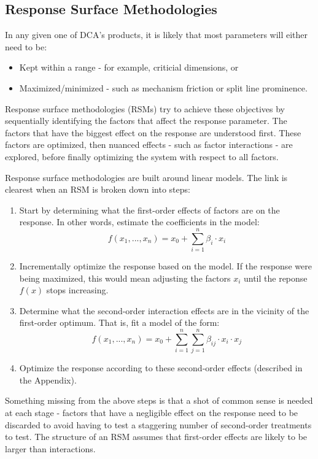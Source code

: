 \documentclass[11pt,a4paper,article]{memoir} %
\begin{document}
\subsection*{Response Surface Methodologies}
In any given one of DCA's products, it is likely that most parameters will either need to be:
\begin{itemize}
	\item Kept within a range - for example, criticial dimensions, or
	\item Maximized/minimized - such as mechanism friction or split line prominence.
\end{itemize}
Response surface methodologies (RSMs) try to achieve these objectives by sequentially identifying the factors that affect the response parameter. The factors that have the biggest effect on the response are understood first. These factors are optimized, then nuanced effects - such as factor interactions - are explored, before finally optimizing the system with respect to all factors.

Response surface methodologies are built around linear models. The link is clearest when an RSM is broken down into steps:
\begin{enumerate}
\item Start by determining what the first-order effects of factors are on the response. In other words, estimate the coefficients in the model:
\begin{equation}
	f(x_1, ..., x_n) = x_0 + \sum_{i = 1}^n \beta_i \cdot x_i
\end{equation}
\item Incrementally optimize the response based on the model. If the response were being maximized, this would mean adjusting the factors $x_i$ until the reponse $f(x)$ stops increasing. 
\item Determine what the second-order interaction effects are in the vicinity of the first-order optimum. That is, fit a model of the form:
\begin{equation}
	f(x_1, ..., x_n) = x_0 + \sum_{i = 1}^n \sum_{j = 1}^n \beta_{ij}\cdot x_i \cdot x_j
\end{equation}
\item Optimize the response according to these second-order effects (described in the Appendix).
\end{enumerate}
Something missing from the above steps is that a shot of common sense is needed at each stage - factors that have a negligible effect on the response need to be discarded to avoid having to test a staggering number of second-order treatments to test. The structure of an RSM assumes that first-order effects are likely to be larger than interactions. 
\end{document}
